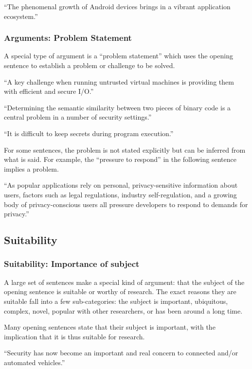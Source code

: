 \documentclass[sigconf]{acmart}
\begin{document}
	``The phenomenal growth of Android devices brings in a vibrant application ecosystem.''
	
	\subsubsection{Arguments: Problem Statement }
	
	A special type of argument is a “problem statement” which uses the opening sentence to establish a problem or challenge to be solved. 
	
	``A key challenge when running untrusted virtual machines is providing them with efficient and secure I/O.''
	
	``Determining the semantic similarity between two pieces of binary code is a central problem in a number of security settings.''
	
	``It is difficult to keep secrets during program execution.''
	
	For some sentences, the problem is not stated explicitly but can be inferred from what is said. For example, the “pressure to respond” in the following sentence implies a problem.
	
	``As popular applications rely on personal, privacy-sensitive information about users, factors such as legal regulations, industry self-regulation, and a growing body of privacy-conscious users all pressure developers to respond to demands for privacy.''
	
	\subsection{Suitability}
	\subsubsection{Suitability: Importance of subject}
	
	A large set of sentences make a special kind of argument: that the subject of the opening sentence is suitable or worthy of research. The exact reasons they are suitable fall into a few sub-categories: the subject is important, ubiquitous, complex, novel, popular with other researchers, or has been around a long time. 
	
	Many opening sentences state that their subject is important, with the implication that it is thus suitable for research.
	
	``Security has now become an important and real concern to connected and/or automated vehicles.''
	
\end{document}
